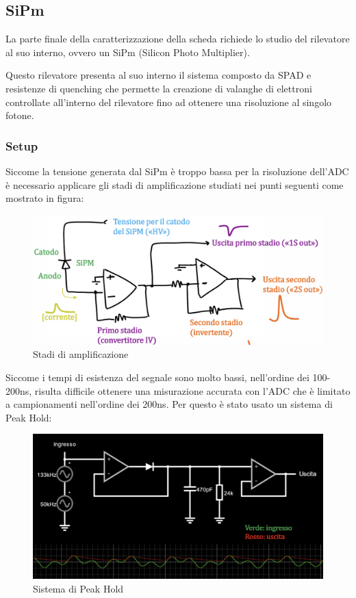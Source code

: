 \pagebreak
\subsection{SiPm}
La parte finale della caratterizzazione della scheda richiede lo studio del rilevatore al suo interno, ovvero un SiPm (Silicon Photo Multiplier).

Questo rilevatore presenta al suo interno il sistema composto da SPAD e resistenze di quenching che permette la creazione di valanghe di elettroni controllate all'interno del rilevatore fino ad ottenere una risoluzione al singolo fotone.

\subsubsection{Setup}

Siccome la tensione generata dal SiPm è troppo bassa per la risoluzione dell'ADC è necessario applicare gli stadi di amplificazione studiati nei punti seguenti come mostrato in figura:

\begin{figure}[!h]
    \centering
    \includegraphics[width=0.5\linewidth]{assets/SiPm/SiPm_Stadi_Amp.png}
    \caption{Stadi di amplificazione}
    \label{fig:SiPm stadi di amp}
\end{figure}

Siccome i tempi di esistenza del segnale sono molto bassi, nell'ordine dei 100-200ns, risulta difficile ottenere una misurazione accurata con l'ADC che è limitato a campionamenti nell'ordine dei 200ns. Per questo è stato usato un sistema di Peak Hold:

\begin{figure}[!h]
    \centering
    \includegraphics[width=0.5\linewidth]{assets/SiPm/SiPm_Peak_hold.png}
    \caption{Sistema di Peak Hold}
\end{figure}

